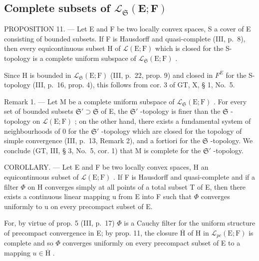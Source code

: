 \subsection{\texorpdfstring{Complete subsets of \(\mathcal{L}_{\mathfrak{S}}(\mathbf{E};\mathbf{F})\)}{Complete subsets of \textbackslash mathcal\{L\}\_\{\textbackslash mathfrak\{S\}\}(\textbackslash mathbf\{E\};\textbackslash mathbf\{F\})}}

PROPOSITION 11. --- Let E and F be two locally convex spaces, S a cover of E consisting of bounded subsets. If F is Hausdorff and quasi-complete (III, p.~8), then every equicontinuous subset H of \(\mathcal{L}(\mathrm{E};\mathrm{F})\) which is closed for the S-topology is a complete uniform subspace of \(\mathcal{L}_{\mathfrak{S}}(\mathrm{E};\mathrm{F})\) .

Since H is bounded in \(\mathcal{L}_{\mathfrak{S}}(\mathrm{E};\mathrm{F})\) (III, p.~22, prop. 9) and closed in \(F^{E}\) for the S-topology (III, p.~16, prop. 4), this follows from cor. 3 of GT, X, § 1, No.~5.

Remark 1. --- Let M be a complete uniform subspace of \(\mathcal{L}_{\mathfrak{S}}(\mathrm{E};\mathrm{F})\) . For every set of bounded subsets \(\mathfrak{S}' \supset \mathfrak{S}\) of E, the \(\mathfrak{S}'\) -topology is finer than the \(\mathfrak{S}\) -topology on \(\mathcal{L}(\mathrm{E};\mathrm{F})\) ; on the other hand, there exists a fundamental system of neighbourhoods of 0 for the \(\mathfrak{S}'\) -topology which are closed for the topology of simple convergence (III, p.~13, Remark 2), and a fortiori for the \(\mathfrak{S}\) -topology. We conclude (GT, III, § 3, No.~5, cor. 1) that M is complete for the \(\mathfrak{S}'\) -topology.

COROLLARY. --- Let E and F be two locally convex spaces, H an equicontinuous subset of \(\mathcal{L}(\mathrm{E};\mathrm{F})\) . If F is Hausdorff and quasi-complete and if a filter \(\Phi\) on H converges simply at all points of a total subset T of E, then there exists a continuous linear mapping u from E into F such that \(\Phi\) converges uniformly to u on every precompact subset of E.

For, by virtue of prop. 5 (III, p.~17) \(\Phi\) is a Cauchy filter for the uniform structure of precompact convergence in E; by prop. 11, the closure \(\overline{\mathrm{H}}\) of H in \(\mathcal{L}_{pc}(\mathrm{E};\mathrm{F})\) is complete and so \(\Phi\) converges uniformly on every precompact subset of E to a mapping \(u\in \overline{\mathrm{H}}\) .

